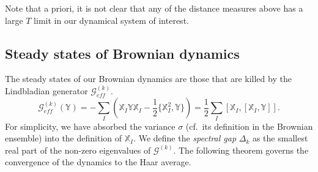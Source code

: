 \documentclass{article}
\theoremstyle{definition}
\begin{document}
    Note that a priori, it is not clear that any of the distance measures above has
    a large $T$ limit in our dynamical system of interest.

    \subsection{Steady states of Brownian dynamics}

    The steady states of our Brownian dynamics are those that are killed by the
    Lindbladian generator $\mathcal{G}_{eff}^{(k)}$.
    \begin{equation}
        \mathcal{G}_{eff}^{(k)}(\mathbb{Y}) = -\sum_{I}\left( \mathbb{X}_{I}\mathbb{Y}
        \mathbb{X}_{I}- \frac{1}{2}\{ \mathbb{X}_{I}^{2}, \mathbb{Y}\} \right) =
        \frac{1}{2}\sum_{I}[\mathbb{X}_{I}, [\mathbb{X}_{I}, \mathbb{Y}]]. \label{eq:generator_form}
    \end{equation}
    For simplicity, we have absorbed the variance $\sigma$ (cf.\ its definition
    in the Brownian ensemble) into the definition of $\mathbb{X}_{I}$. We define
    the \textit{spectral gap} $\Delta_{k}$ as the smallest real part of the non-zero
    eigenvalues of $\mathcal{G}^{(k)}$. The following theorem governs the
    convergence of the dynamics to the Haar average.
\end{document}

